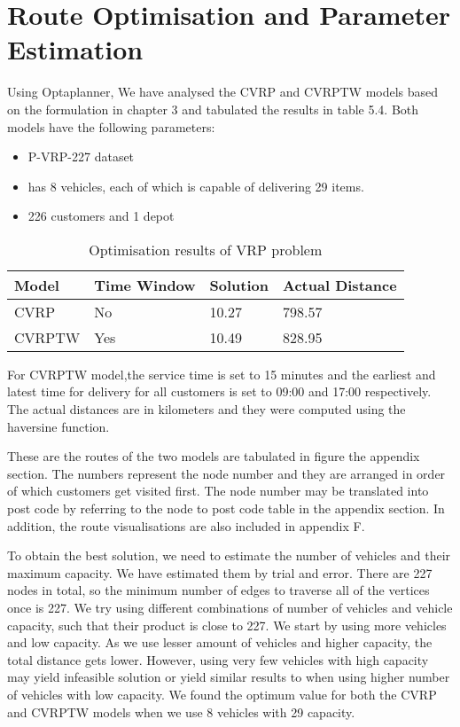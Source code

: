 \section{Route Optimisation and Parameter Estimation}
Using Optaplanner, We have analysed the CVRP and CVRPTW models based on the formulation in chapter 3 and tabulated the results in
table 5.4. Both models have the following parameters:
\begin{itemize}
\item P-VRP-227 dataset
\item has 8 vehicles, each of which is capable of delivering 29 items.
\item 226 customers and 1 depot
\end{itemize}
\begin{table}[!ht]
\centering
\begin{tabular}{|l|l|l|l|}
\hline
Model  & Time Window & Solution & Actual Distance \\ \hline
CVRP   & No          & 10.27   & 798.57\\ \hline
CVRPTW & Yes         & 10.49   & 828.95\\ \hline
\end{tabular}
\caption{Optimisation results of VRP problem}
\label{my-label}
\end{table}

For CVRPTW model,the service time is set to 15 minutes and the earliest and latest time for delivery for all customers is set to 09:00 and 17:00 respectively.
The actual distances are in kilometers and they were computed using the haversine function.

These are the routes of the two models are tabulated in figure the appendix section. The numbers represent the node number and
they are arranged in order of which customers get visited first. The node number may be translated into post code by referring
to the node to post code table in the appendix section. In addition, the route visualisations are also included in appendix F.

To obtain the best solution, we need to estimate the number of vehicles and their maximum capacity.
We have estimated them by trial and error. There are 227 nodes in total, so the minimum number of edges to traverse
 all of the vertices once is 227. We try using different combinations of number of vehicles and vehicle capacity, such that their product
 is close to 227. We start by using more vehicles and low
capacity. As we use lesser amount of vehicles and higher capacity, the total distance gets lower. However, using very few vehicles with high capacity may
yield infeasible solution or yield similar results to when using higher number of vehicles with low capacity.
We found the optimum value for both the CVRP and CVRPTW models when we use 8 vehicles with 29 capacity.


